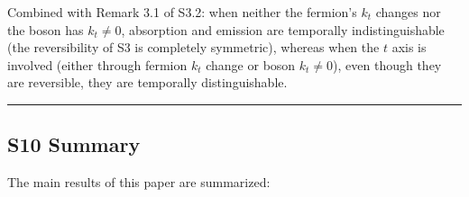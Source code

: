 \documentclass[
  a4paper,11pt]{article}
\theoremstyle{definition}
\theoremstyle{remark}
\begin{document}
Combined with Remark 3.1 of S3.2: when neither the fermion's \(k_t\)
changes nor the boson has \(k_t \neq 0\), absorption and emission are
temporally indistinguishable (the reversibility of S3 is completely
symmetric), whereas when the \(t\) axis is involved (either through
fermion \(k_t\) change or boson \(k_t \neq 0\)), even though they are
reversible, they are temporally distinguishable.

\begin{center}\rule{0.5\linewidth}{0.5pt}\end{center}

\subsection{S10 Summary}\label{s10-summary}

The main results of this paper are summarized:
\end{document}

